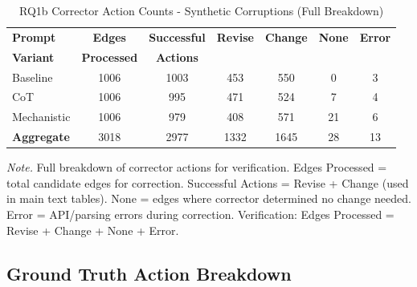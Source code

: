 \begin{table}[H]
\centering
\caption{RQ1b Corrector Action Counts - Synthetic Corruptions (Full Breakdown)}
\label{tab:rq1b_action_counts_synthetic}
\begin{threeparttable}
\begin{tabular}{lcccccc}
\toprule
\textbf{Prompt} & \textbf{Edges} & \textbf{Successful} & \textbf{Revise} & \textbf{Change} & \textbf{None} & \textbf{Error} \\
\textbf{Variant} & \textbf{Processed} & \textbf{Actions} & & & & \\
\midrule
Baseline & 1006 & 1003 & 453 & 550 & 0 & 3 \\
CoT & 1006 & 995 & 471 & 524 & 7 & 4 \\
Mechanistic & 1006 & 979 & 408 & 571 & 21 & 6 \\
\midrule
\textbf{Aggregate} & 3018 & 2977 & 1332 & 1645 & 28 & 13 \\
\bottomrule
\end{tabular}
\begin{tablenotes}
\small
\item \textit{Note.} Full breakdown of corrector actions for verification. 
Edges Processed = total candidate edges for correction.
Successful Actions = Revise + Change (used in main text tables).
None = edges where corrector determined no change needed.
Error = API/parsing errors during correction.
Verification: Edges Processed = Revise + Change + None + Error.
\end{tablenotes}
\end{threeparttable}
\end{table}

\subsection{Ground Truth Action Breakdown}

